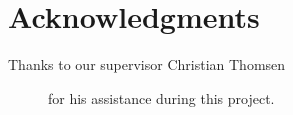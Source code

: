 \section*{Acknowledgments} %


\begin{description}
\item[Thanks to our supervisor Christian Thomsen] for his assistance during this project. 
\end{description}